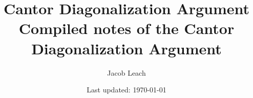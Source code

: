 
\title{%
  Cantor Diagonalization Argument
  \\[1em]
  \normalsize{Compiled notes of the Cantor Diagonalization Argument}
}

\author{%
  \normalsize{Jacob Leach}
}

\date{%
  \normalsize
  \vspace{-1ex}Last updated: \today
}

\maketitle
\label{sec:contents}
\tableofcontents